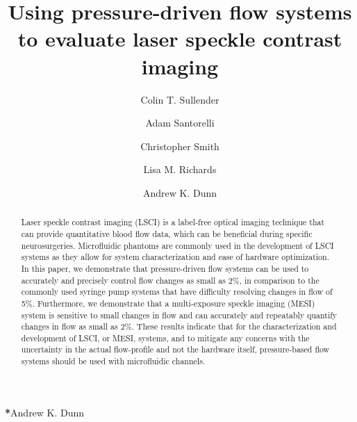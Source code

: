\documentclass[12pt]{spieman}
\title{Using pressure-driven flow systems to evaluate laser speckle contrast imaging}
\author[a]{Colin T. Sullender}
\author[a]{Adam Santorelli}
\author[a]{Christopher Smith}
\author[a]{Lisa M. Richards}
\author[a,*]{Andrew K. Dunn}
\affil[a]{Department of Biomedical Engineering, The University of Texas at Austin, Austin, TX, 78712, USA}
\begin{document}
\maketitle


\begin{abstract}
Laser speckle contrast imaging (LSCI) is a label-free optical imaging technique that can provide quantitative blood flow data, which can be beneficial during specific neurosurgeries. Microfluidic phantoms are commonly used in the development of LSCI systems as they allow for system characterization and ease of hardware optimization. In this paper, we demonstrate that pressure-driven flow systems can be used to accurately and precisely control flow changes as small as 2\%, in comparison to the commonly used syringe pump systems that have difficulty resolving changes in flow of 5\%. Furthermore, we demonstrate that a multi-exposure speckle imaging (MESI) system is sensitive to small changes in flow and can accurately and repeatably quantify changes in flow as small as 2\%. These results indicate that for the characterization and development of LSCI, or MESI, systems, and to mitigate any concerns with the uncertainty in the actual flow-profile and not the hardware itself, pressure-based flow systems should be used with microfluidic channels.
\end{abstract}


{\noindent \footnotesize\textbf{*}Andrew K. Dunn }
\end{document}
